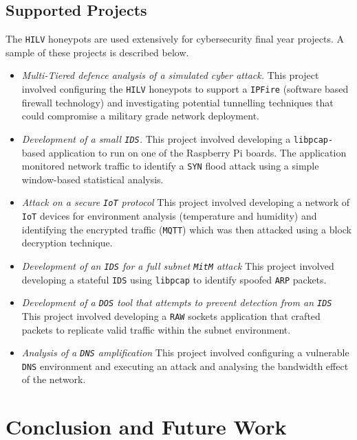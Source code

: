\documentclass[10pt,journal]{IEEEtran}
\begin{document}
\subsection{Supported Projects\label{Projects}}

The \texttt{HILV} honeypots are used extensively for cybersecurity final year
projects. A sample of these projects is described below.

\begin{itemize} 
  \item \noindent \emph{Multi-Tiered defence analysis of a simulated cyber
    attack.} This project involved configuring the \texttt{HILV} honeypots to
    support a \texttt{IPFire} (software based firewall technology) and
    investigating potential tunnelling techniques that could compromise a
    military grade network deployment.  
  \item \noindent \emph{Development of a small \texttt{IDS}.} This project
    involved developing a \texttt{libpcap-}based application to run on one of the
    Raspberry Pi boards. The application monitored network
    traffic to identify a \texttt{SYN} flood attack using a simple window-based
    statistical analysis.  
    \item \noindent \emph{Attack on a secure \texttt{IoT} protocol} This
      project involved developing a network of \texttt{IoT} devices for
      environment analysis (temperature and humidity) and identifying the
      encrypted traffic (\texttt{MQTT}) which was then attacked using a block
      decryption technique.  
    \item \noindent \emph{Development of an \texttt{IDS} for a full subnet
      \texttt{MitM} attack} This project involved developing a stateful 
      \texttt{IDS} using \texttt{libpcap} to identify spoofed \texttt{ARP} packets.  
    \item \noindent \emph{Development of a \texttt{DOS} tool that attempts to
      prevent detection from an \texttt{IDS}} This project involved developing
      a \texttt{RAW} sockets application that crafted packets to
      replicate valid traffic within the subnet environment.  
     \item \noindent \emph{Analysis of a \texttt{DNS} amplification} This
       project involved configuring a vulnerable \texttt{DNS} environment and
       executing an attack and analysing the bandwidth effect of the network.
\end{itemize}

\section{Conclusion and Future Work\label{sec:ConclusionFuture}}
\end{document}
